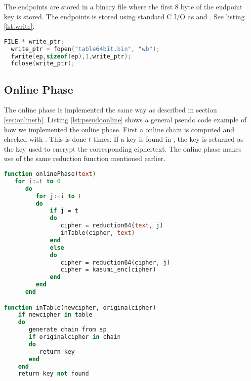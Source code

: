 The endpoints are stored in a binary file where the first 8 byte of
the endpoint key is stored. The endpoints is stored using standard C
I/O as  and . See listing \ref{lst:write}.
\newpage
\begin{lstlisting}[frame=single, language=C, mathescape,
captionpos=b, caption={Writing to a binary}, label={lst:write}]
  FILE * write_ptr;
  write_ptr = fopen("table64bit.bin", "wb");
  fwrite(ep,sizeof(ep),1,write_ptr);
  fclose(write_ptr);
\end{lstlisting}

\subsection{Online Phase}
The online phase is implemented the same way as described in section
\ref{sec:onlinerb}. Listing \ref{lst:pseudoonline} shows a general
pseudo code example of how we implemented the online phase. First a
online chain is computed and checked with . This is done
$t$ times. If a key is found in , the key is returned as
the key used to encrypt the corresponding ciphertext. The online phase
makes use of the same reduction function mentioned earlier.
\newpage
\begin{lstlisting}[frame=single, language=Pascal, mathescape,
captionpos=b, caption={Pseudo code for online phase}, label={lst:pseudoonline}]
function onlinePhase(text)
   for i:=t to 0
      do
         for j:=i to t
         do
             if j = t
             do
                cipher = reduction64(text, j)
                inTable(cipher, text)
             end
             else
             do
                cipher = reduction64(cipher, j)
                cipher = kasumi_enc(cipher)
             end
         end
      end

function inTable(newcipher, originalcipher)
    if newcipher in table
    do
       generate chain from sp
       if originalcipher in chain
       do
          return key
       end
    end
    return key not found
\end{lstlisting}



